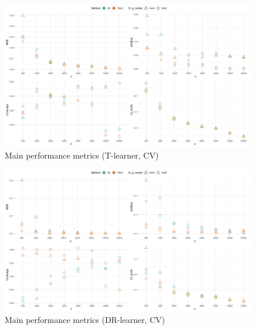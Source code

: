 \documentclass[
]{article}
\begin{document}
\begin{figure}[H]

{\centering \includegraphics[width=1\linewidth]{plot_dots_t_cv_v} 

}

\caption{Main performance metrics (T-learner, CV)}\label{fig:unnamed-chunk-17}
\end{figure}

\begin{figure}[H]

{\centering \includegraphics[width=1\linewidth]{plot_dots_dr_cv_v} 

}

\caption{Main performance metrics (DR-learner, CV)}\label{fig:unnamed-chunk-18}
\end{figure}
\end{document}
